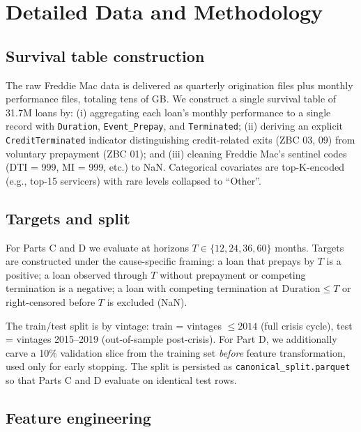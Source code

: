 \documentclass[11pt,a4paper]{article}
\begin{document}
\section{Detailed Data and Methodology}\label{app:methodology}

\subsection{Survival table construction}

The raw Freddie Mac data is delivered as quarterly origination files plus monthly performance files, totaling tens of GB. We construct a single survival table of 31.7M loans by:
(i) aggregating each loan's monthly performance to a single record with \texttt{Duration}, \texttt{Event\_Prepay}, and \texttt{Terminated};
(ii) deriving an explicit \texttt{CreditTerminated} indicator distinguishing credit-related exits (ZBC 03, 09) from voluntary prepayment (ZBC 01); and
(iii) cleaning Freddie Mac's sentinel codes (DTI = 999, MI = 999, etc.) to NaN.
Categorical covariates are top-K-encoded (e.g., top-15 servicers) with rare levels collapsed to ``Other''.

\subsection{Targets and split}

For Parts C and D we evaluate at horizons $T \in \{12, 24, 36, 60\}$ months. Targets are constructed under the cause-specific framing: a loan that prepays by $T$ is a positive; a loan observed through $T$ without prepayment or competing termination is a negative; a loan with competing termination at $\text{Duration} \leq T$ or right-censored before $T$ is excluded (NaN).

The train/test split is by vintage: train = vintages $\leq 2014$ (full crisis cycle), test = vintages 2015--2019 (out-of-sample post-crisis). For Part D, we additionally carve a 10\% validation slice from the training set \emph{before} feature transformation, used only for early stopping. The split is persisted as \texttt{canonical\_split.parquet} so that Parts C and D evaluate on identical test rows.

\subsection{Feature engineering}
\end{document}
